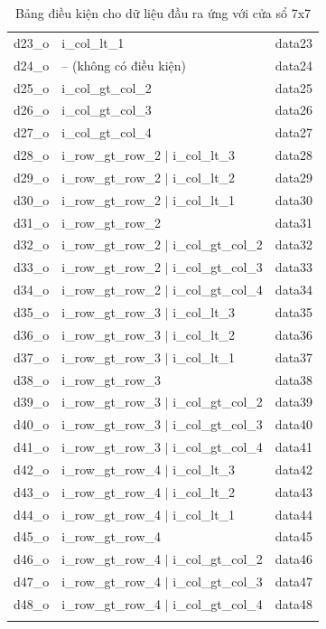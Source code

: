 \begin{longtable}{|p{3cm}|p{8cm}|p{4cm}|}
	d23\_o & i\_col\_lt\_1 & data23 \\
	d24\_o & -- (không có điều kiện) & data24 \\
	d25\_o & i\_col\_gt\_col\_2 & data25 \\
	d26\_o & i\_col\_gt\_col\_3 & data26 \\
	d27\_o & i\_col\_gt\_col\_4 & data27 \\
	d28\_o & i\_row\_gt\_row\_2 $\vert$ i\_col\_lt\_3 & data28 \\
	d29\_o & i\_row\_gt\_row\_2 $\vert$ i\_col\_lt\_2 & data29 \\
	d30\_o & i\_row\_gt\_row\_2 $\vert$ i\_col\_lt\_1 & data30 \\
	d31\_o & i\_row\_gt\_row\_2 & data31 \\
	d32\_o & i\_row\_gt\_row\_2 $\vert$ i\_col\_gt\_col\_2 & data32 \\
	d33\_o & i\_row\_gt\_row\_2 $\vert$ i\_col\_gt\_col\_3 & data33 \\
	d34\_o & i\_row\_gt\_row\_2 $\vert$ i\_col\_gt\_col\_4 & data34 \\
	d35\_o & i\_row\_gt\_row\_3 $\vert$ i\_col\_lt\_3 & data35 \\
	d36\_o & i\_row\_gt\_row\_3 $\vert$ i\_col\_lt\_2 & data36 \\
	d37\_o & i\_row\_gt\_row\_3 $\vert$ i\_col\_lt\_1 & data37 \\
	d38\_o & i\_row\_gt\_row\_3 & data38 \\
	d39\_o & i\_row\_gt\_row\_3 $\vert$ i\_col\_gt\_col\_2 & data39 \\
	d40\_o & i\_row\_gt\_row\_3 $\vert$ i\_col\_gt\_col\_3 & data40 \\
	d41\_o & i\_row\_gt\_row\_3 $\vert$ i\_col\_gt\_col\_4 & data41 \\
	d42\_o & i\_row\_gt\_row\_4 $\vert$ i\_col\_lt\_3 & data42 \\
	d43\_o & i\_row\_gt\_row\_4 $\vert$ i\_col\_lt\_2 & data43 \\
	d44\_o & i\_row\_gt\_row\_4 $\vert$ i\_col\_lt\_1 & data44 \\
	d45\_o & i\_row\_gt\_row\_4 & data45 \\
	d46\_o & i\_row\_gt\_row\_4 $\vert$ i\_col\_gt\_col\_2 & data46 \\
	d47\_o & i\_row\_gt\_row\_4 $\vert$ i\_col\_gt\_col\_3 & data47 \\
	d48\_o & i\_row\_gt\_row\_4 $\vert$ i\_col\_gt\_col\_4 & data48 \\
	\hline
		\caption{Bảng điều kiện cho dữ liệu đầu ra ứng với cửa sổ 7x7} 
		\label{tab:conditionForOutputZero7x7}
\end{longtable}

